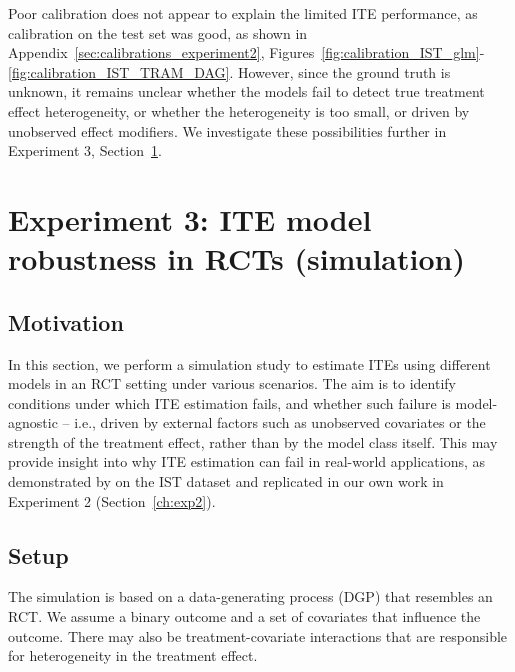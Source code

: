 \medskip


Poor calibration does not appear to explain the limited ITE performance, as calibration on the test set was good, as shown in Appendix~\ref{sec:calibrations_experiment2}, Figures~\ref{fig:calibration_IST_glm}-\ref{fig:calibration_IST_TRAM_DAG}. However, since the ground truth is unknown, it remains unclear whether the models fail to detect true treatment effect heterogeneity, or whether the heterogeneity is too small, or driven by unobserved effect modifiers. We investigate these possibilities further in Experiment 3, Section~\ref{ch:experiment3}.










\section{Experiment 3: ITE model robustness in RCTs (simulation)} \label{ch:experiment3}




\subsection{Motivation}

In this section, we perform a simulation study to estimate ITEs using different models in an RCT setting under various scenarios. The aim is to identify conditions under which ITE estimation fails, and whether such failure is model-agnostic -- i.e., driven by external factors such as unobserved covariates or the strength of the treatment effect, rather than by the model class itself. This may provide insight into why ITE estimation can fail in real-world applications, as demonstrated by \citet{chen2025} on the IST dataset and replicated in our own work in Experiment 2 (Section~\ref{ch:exp2}). 


\subsection{Setup} \label{sec:methods_experiment3}

The simulation is based on a data-generating process (DGP) that resembles an RCT. We assume a binary outcome and a set of covariates that influence the outcome. There may also be treatment-covariate interactions that are responsible for heterogeneity in the treatment effect.

